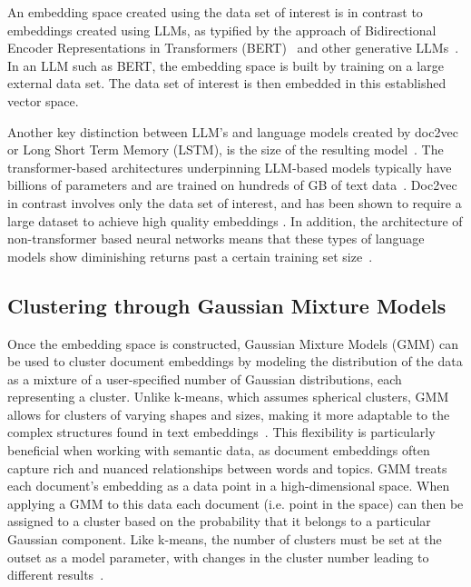 \documentclass{article}
\begin{document}
An embedding space created using the data set of interest is in contrast to embeddings created using LLMs, as typified by the approach of Bidirectional Encoder Representations in Transformers (BERT)~\cite{devlin2019,subakti2022} and other generative LLMs~\cite{WOS:001242193200001}.  In an LLM such as BERT, the embedding space is built by training on a large external data set.  The data set of interest is then embedded in this established vector space.


Another key distinction between LLM's and language models created by doc2vec or Long Short Term Memory (LSTM), is the size of the resulting model~\cite{bender2021dangers}. The transformer-based architectures underpinning LLM-based models typically have billions of parameters and are trained on hundreds of GB of text data~\cite{floridi2020}.  Doc2vec in contrast involves only the data set of interest, and has been shown to require a large dataset to achieve high quality embeddings \cite{lau-baldwin-2016-empirical}. In addition, the architecture of non-transformer based neural networks means that these types of language models show diminishing returns past a certain training set size~\cite{bender2021dangers}.



\subsection{Clustering through Gaussian Mixture Models}

Once the embedding space is constructed, Gaussian Mixture Models (GMM) can be used to cluster document embeddings by modeling the distribution of the data as a mixture of a user-specified number of Gaussian distributions, each representing a cluster. Unlike k-means, which assumes spherical clusters, GMM allows for clusters of varying shapes and sizes, making it more adaptable to the complex structures found in text embeddings~\cite{patel2020clustering}. This flexibility is particularly beneficial when working with semantic data, as document embeddings often capture rich and nuanced relationships between words and topics\cite{sia-etal-2020-tired}.  GMM treats each document's embedding as a data point in a high-dimensional space. When applying a GMM to this data each document (i.e. point in the space) can then be assigned to a cluster based on the probability that it belongs to a particular Gaussian component. Like k-means, the number of clusters must be set at the outset as a model parameter, with changes in the cluster number leading to different results~\cite{fraley1998many}.
\end{document}

